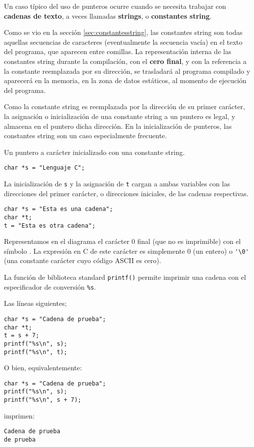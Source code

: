 Un caso típico del uso de punteros ocurre cuando se necesita
trabajar con \textbf{cadenas de texto}, a veces llamadas \textbf{strings}, o \textbf{constantes string}. 

Como se vio en la sección \ref{sec:constantesstring}, las constantes string son todas aquellas secuencias de caracteres (eventualmente la secuencia vacía) en el texto del programa, que aparecen entre comillas. La representación interna de las constantes string durante la compilación, con el \textbf{cero final}, y con la referencia a la constante reemplazada por su dirección, se trasladará al programa compilado y aparecerá en la memoria, en la zona de datos estáticos, al momento de ejecución del programa. 

Como la constante string es reemplazada por la dirección de su primer carácter, la asignación o inicialización de una constante string a un puntero es legal, y almacena en el puntero dicha dirección. En la inicialización de punteros, las constantes string son un caso especialmente frecuente.

\begin{ejemplo}
Un puntero a carácter inicializado con una constante string.
\begin{lstlisting}
char *s = "Lenguaje C";
\end{lstlisting}
\end{ejemplo}

\begin{ejemplo}
La inicialización
de \texttt{s} y la asignación de \texttt{t} cargan a ambas variables con las direcciones del primer
carácter, o direcciones iniciales, de las cadenas respectivas.
\begin{lstlisting}
char *s = "Esta es una cadena";
char *t;
t = "Esta es otra cadena";
\end{lstlisting}
\end{ejemplo}

Representamos en el diagrama el carácter 0 final (que no es imprimible) con el
símbolo \textcurrency. La expresión en C de este carácter es simplemente 0 (un entero) o
\lstinline{'\0'} (una constante carácter cuyo código ASCII es cero).

La función de biblioteca standard \lstinline{printf()} permite imprimir una cadena con el
especificador de conversión \lstinline{%s}.

\begin{ejemplo}
Las líneas siguientes;
\begin{lstlisting}
char *s = "Cadena de prueba";
char *t;
t = s + 7;
printf("%s\n", s);
printf("%s\n", t);
\end{lstlisting}
O bien, equivalentemente:
\begin{lstlisting}
char *s = "Cadena de prueba";
printf("%s\n", s);
printf("%s\n", s + 7);
\end{lstlisting}

imprimen:
\begin{lstlisting}
Cadena de prueba
de prueba
\end{lstlisting}
\end{ejemplo}

